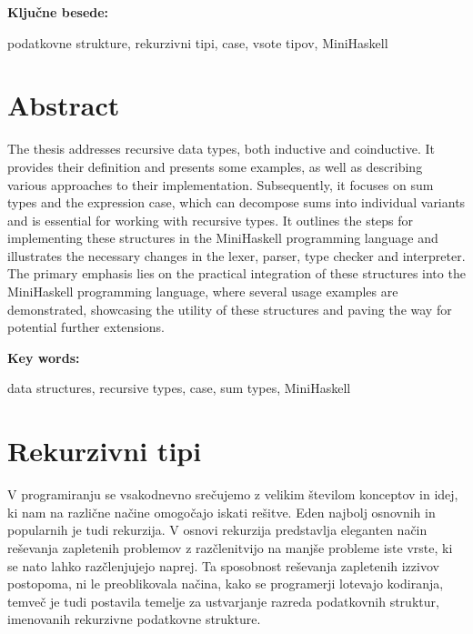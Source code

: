\documentclass[12pt,a4paper,openany]{book}
\begin{document}
\vspace{1.3cm}
\noindent
{\large \bf Ključne besede:}

\vspace{0.5cm}
\noindent
podatkovne strukture, rekurzivni tipi, case, vsote tipov, MiniHaskell


\chapter*{Abstract}


The thesis addresses recursive data types, both inductive and coinductive. It provides their definition and presents some examples, as well as 
describing various approaches to their implementation. Subsequently, it focuses on sum types and the expression case, which can 
decompose sums into individual variants and is essential for working with recursive types. It outlines the steps for implementing these 
structures in the MiniHaskell programming language and illustrates the necessary changes in the lexer, parser, type checker and interpreter. 
The primary emphasis lies on the practical integration of these structures into the MiniHaskell programming language, where several usage 
examples are demonstrated, showcasing the utility of these structures and paving the way for potential further extensions.

\vspace{1.3cm}
\noindent
{\large \bf Key words:}

\vspace{0.5cm}
\noindent
data structures, recursive types, case, sum types, MiniHaskell






\newpage
\chapter{Rekurzivni tipi}
V programiranju se vsakodnevno srečujemo z velikim številom konceptov in idej, ki nam na različne načine omogočajo iskati rešitve. Eden najbolj osnovnih in popularnih je tudi rekurzija.
V osnovi rekurzija predstavlja eleganten način reševanja zapletenih problemov z razčlenitvijo na manjše probleme iste vrste, ki se nato lahko razčlenjujejo naprej. Ta sposobnost reševanja zapletenih izzivov 
postopoma, ni le preoblikovala načina, kako se programerji lotevajo kodiranja, temveč je tudi postavila temelje za ustvarjanje razreda podatkovnih struktur, imenovanih rekurzivne podatkovne strukture.
\end{document}
